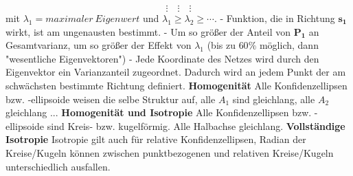 \documentclass[12pt]{article}
\begin{document}
\begin{equation*}
\vdots \quad \vdots \quad \vdots
\end{equation*}
mit $\lambda_1 = maximaler\ Eigenwert$ und $\lambda_1 \geq \lambda_2 \geq \cdots$. \newline
\newline
- Funktion, die in Richtung $\bm{s_1}$ wirkt, ist am ungenausten bestimmt.\newline
- Um so größer der Anteil von $\bm{P_1}$ an Gesamtvarianz, um so größer der Effekt von $\lambda_1$ (bis zu $60\%$ möglich, dann "wesentliche Eigenvektoren")\newline
- Jede Koordinate des Netzes wird durch den Eigenvektor ein Varianzanteil zugeordnet. Dadurch wird an jedem Punkt der am schwächsten bestimmte Richtung definiert.\newline
\textbf{Homogenität} \newline
Alle Konfidenzellipsen bzw. -ellipsoide weisen die selbe Struktur auf, alle $A_1$ sind gleichlang, alle $A_2$ gleichlang ...\newline
\textbf{Homogenität und Isotropie} \newline
Alle Konfidenzellipsen bzw. -ellipsoide sind Kreis- bzw. kugelförmig. Alle Halbachse gleichlang.\newline
\textbf{Vollständige Isotropie} \newline
Isotropie gilt auch für relative Konfidenzellipsen, Radian der Kreise/Kugeln können zwischen punktbezogenen und relativen Kreise/Kugeln unterschiedlich ausfallen.
\newpage
\end{document}
